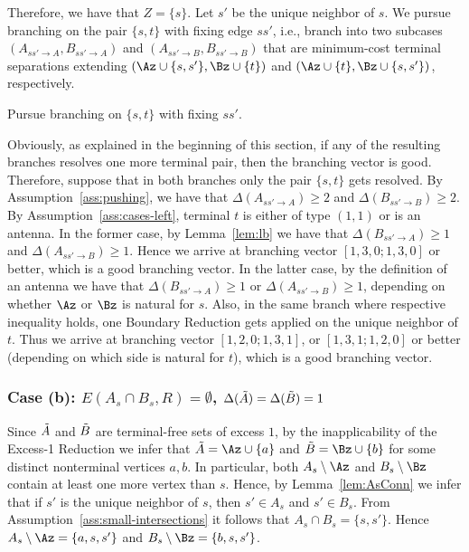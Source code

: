 Therefore, we have that $Z=\{s\}$. Let $s'$ be the unique neighbor of $s$. We pursue branching on the pair $\{s,t\}$ with fixing edge $ss'$, i.e., branch into two subcases $(A_{ss'\to A},B_{ss'\to A})$ and $(A_{ss'\to B},B_{ss'\to B})$ that are minimum-cost terminal separations extending $(\Az\cup \{s,s'\},\Bz\cup \{t\})$ and $(\Az\cup \{t\},\Bz\cup \{s,s'\})$, respectively.

\begin{branching}
Pursue branching on $\{s,t\}$ with fixing $ss'$.
\end{branching}

Obviously, as explained in the beginning of this section, if any of the resulting branches resolves one more terminal pair, then the branching vector is good. Therefore, suppose that in both branches only the pair $\{s,t\}$ gets resolved. By Assumption~\ref{ass:pushing}, we have that $\Delta(A_{ss'\to A})\geq 2$ and $\Delta(B_{ss'\to B})\geq 2$. By Assumption~\ref{ass:cases-left}, terminal $t$ is either of type $(1,1)$ or is an antenna. In the former case, by Lemma~\ref{lem:lb} we have that $\Delta(B_{ss'\to A})\geq 1$ and $\Delta(A_{ss'\to B})\geq 1$. Hence we arrive at branching vector $[1,3,0;1,3,0]$ or better, which is a good branching vector. In the latter case, by the definition of an antenna we have that $\Delta(B_{ss'\to A})\geq 1$ or $\Delta(A_{ss'\to B})\geq 1$, depending on whether $\Az$ or $\Bz$ is natural for $s$. Also, in the same branch where respective inequality holds, one Boundary Reduction gets applied on the unique neighbor of $t$. Thus we arrive at branching vector $[1,2,0;1,3,1]$, or $[1,3,1;1,2,0]$ or better (depending on which side is natural for $t$), which is a good branching vector.





\subsubsection{Case (b): $E(A_s \cap B_s, R) = \emptyset$, $\Delta(\tilde{A})=\Delta(\tilde{B})=1$}



Since $\tilde{A}$ and $\tilde{B}$ are terminal-free sets of excess $1$, by the inapplicability of the Excess-1 Reduction we infer that $\Atr = \Az \cup \{a\}$ and $\Btr = \Bz \cup \{b\}$ for some distinct nonterminal vertices $a,b$. In particular, both $A_s\setminus \Az$ and $B_s\setminus \Bz$ contain at least one more vertex than $s$. Hence, by Lemma~\ref{lem:AsConn} we infer that if $s'$ is the unique neighbor of $s$, then $s'\in A_s$ and $s'\in B_s$. From Assumption~\ref{ass:small-intersections} it follows that $A_s\cap B_s=\{s,s'\}$. Hence $A_s \setminus \Az=\{a,s,s'\}$ and $B_s \setminus \Bz=\{b,s,s'\}$.


